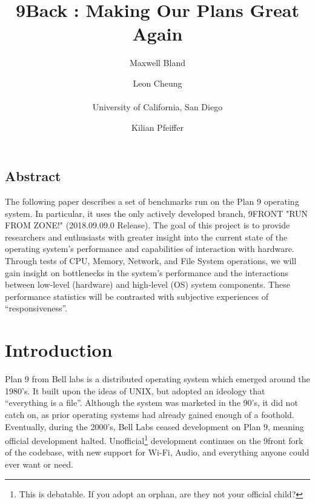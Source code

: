 \documentclass[letterpaper,twocolumn,10pt]{article}
\begin{document}
\date{}

\title{\Large \bf 9Back : Making Our Plans Great Again}

\author{
{\rm Maxwell Bland}
\and
{\rm Leon Cheung}\\ \\
University of California, San Diego
\and
{\rm Kilian Pfeiffer}\\
} %

\maketitle

\thispagestyle{empty}


\subsection*{Abstract}
The following paper describes a set of benchmarks run on the Plan 9 operating system. In particular, it uses the only actively developed branch, 9FRONT "RUN FROM ZONE!" (2018.09.09.0 Release). The goal of this project is to provide researchers and enthusiasts with greater insight into the current state of the operating system's performance and capabilities of interaction with hardware. Through tests of CPU, Memory, Network, and File System operations, we will gain insight on bottlenecks in the system's performance and the interactions between low-level (hardware) and high-level (OS) system components. These performance statistics will be contrasted with subjective experiences of ``responsiveness''.

\section{Introduction}

Plan 9 from Bell labs is a distributed operating system which emerged around the 1980's. It built upon the ideas of UNIX, but adopted an ideology that ``everything is a file''. Although the system was marketed in the 90's, it did not catch on, as prior operating systems had already gained enough of a foothold. Eventually, during the 2000's, Bell Labs ceased development on Plan 9, meaning official development halted. Unofficial\footnote{This is debatable. If you adopt an orphan, are they not your official child?} development continues on the 9front fork of the codebase, with new support for Wi-Fi, Audio, and everything anyone could ever want or need. 
\end{document}
